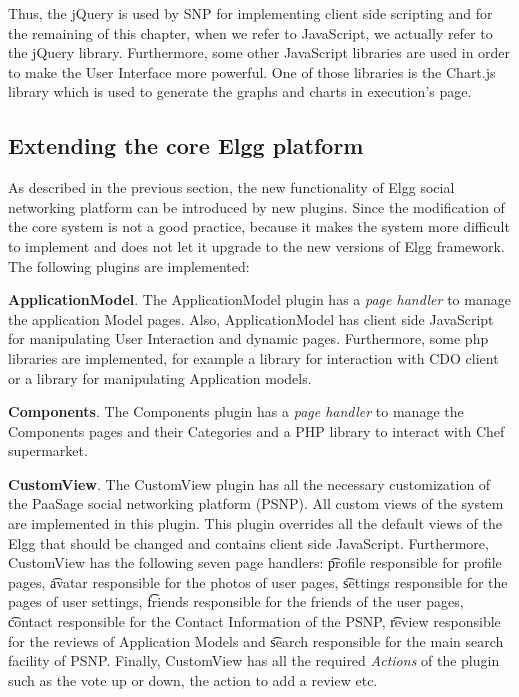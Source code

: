 Thus, the jQuery is used by SNP for implementing client side scripting and for the remaining of this chapter, when we refer to JavaScript, we actually refer to the jQuery library. 
Furthermore, some other JavaScript libraries are used in order to make the User Interface more powerful. One of those libraries is the Chart.js~\cite{chartjs_url} library which is used to generate the graphs and charts in execution's page.

\subsection{Extending the core Elgg platform}
As described in the previous section, the new functionality of Elgg social networking platform can be introduced by new plugins. Since the modification of the core system is not a good practice, because it makes the system more difficult to implement and does not let it upgrade to the new versions of Elgg framework. The following plugins are implemented:

\textbf{ApplicationModel}. The ApplicationModel plugin has a {\it page handler} to manage the application Model pages. Also, ApplicationModel has client side JavaScript for manipulating User Interaction and dynamic pages. Furthermore, some php libraries are implemented, for example a library for interaction with CDO client or a library for manipulating Application models. 

\textbf{Components}. The Components plugin has a {\it page handler} to manage the Components pages and their Categories and a PHP library to interact with Chef supermarket.

\textbf{CustomView}. The CustomView plugin has all the necessary customization of the PaaSage social networking platform (PSNP). All custom views of the system are implemented in this plugin. This plugin overrides all the default views of the Elgg that should be changed and contains client side JavaScript. Furthermore, CustomView has the following seven page handlers: {\t profile} responsible for profile pages, {\t avatar} responsible for the photos of user pages, {\t settings} responsible for the pages of user settings, {\t friends} responsible for the friends of the user pages, {\t contact} responsible for the Contact Information of the PSNP, {\t review} responsible for the reviews of Application Models and {\t search} responsible for the main search facility of PSNP. Finally, CustomView has all the required \emph{Actions} of the plugin such as the vote up or down, the action to add a review etc.


